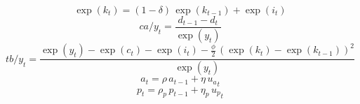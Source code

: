 \begin{dmath}
\exp\left({{k}}_{t}\right)=\left(1-{{\delta}}\right)\, \exp\left({{k}}_{t-1}\right)+\exp\left({{i}}_{t}\right)
\end{dmath}
\begin{dmath}
{{ca/y}}_{t}=\frac{{{d}}_{t-1}-{{d}}_{t}}{\exp\left({y}_{t}\right)}
\end{dmath}
\begin{dmath}
{{tb/y}}_{t}=\frac{\exp\left({y}_{t}\right)-\exp\left({c}_{t}\right)-\exp\left({{i}}_{t}\right)-\frac{{{\phi}}}{2}\, \left(\exp\left({{k}}_{t}\right)-\exp\left({{k}}_{t-1}\right)\right)^{2}}{\exp\left({y}_{t}\right)}
\end{dmath}
\begin{dmath}
{{a}}_{t}={{\rho}}\, {{a}}_{t-1}+{{\eta}}\, {{u_a}}_{t}
\end{dmath}
\begin{dmath}
{{p}}_{t}={{\rho_p}}\, {{p}}_{t-1}+{{\eta_p}}\, {{u_p}}_{t}
\end{dmath}
